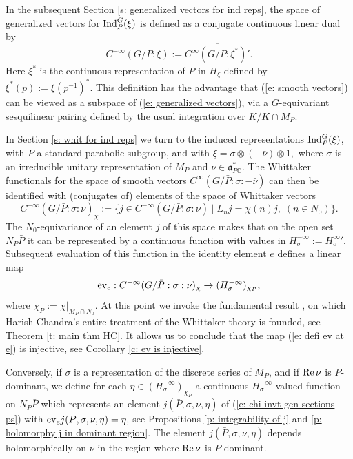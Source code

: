 \documentclass[12pt,a4paper]{article}
\def\msy#1{{\mathbb #1}}
\def\C{{\msy C}}
\def\gs{\sigma}
\def\got#1{\mathfrak #1}
\def\fa{{\got a}}
\def\to{\rightarrow}
\def\Re{{\rm Re}\,}
\def\iC{{\scriptscriptstyle \C}}
\numberwithin{Thm}{section}
\numberwithin{equation}{section}
\def\Ind{{\rm Ind}}
\def\ev{{\rm ev}}
\def\faPdc{{\fa_{P\iC}^*}}
\numberwithin{equation}{section}
\def\faPdc{\fa_{P\iC}^*}
\def\cchi{\chi}
\begin{document}
In the subsequent Section \ref{s: generalized vectors for ind reps}, the space of generalized 
vectors for $\Ind_P^G(\xi)$ is defined as a conjugate continuous linear dual by 
\begin{equation}
\label{e: generalized vectors}
C^{-\infty}(G/P:\xi) := \overline{C^\infty(G/P:\xi^*)'}.
\end{equation}
Here $\xi^*$ is the continuous representation of $P$ in $H_\xi$ defined by $\xi^*(p):= \xi(p^{-1})^*.$ 
This definition has the advantage that (\ref{e: smooth vectors}) can be viewed as a subspace of 
(\ref{e: generalized vectors}), via a $G$-equivariant sesquilinear pairing defined by the usual
integration 
over $K/K\cap M_P.$ 

In Section \ref{s: whit for ind reps} we turn to the induced representations $\Ind_{\bar P}^G(\xi)$,
with $P$ a standard parabolic subgroup, and with $\xi = \gs \otimes (-\bar \nu) \otimes 1,$
 where $\gs$ is an irreducible unitary representation
of $M_P$ and $\nu \in \faPdc.$ The Whittaker functionals for the space of smooth vectors $C^\infty(G/\bar P:\gs: -\bar \nu)$ can then be identified with (conjugates of) elements of the space
of Whittaker vectors 
\begin{equation}
\label{e: chi invt gen sections ps} 
C^{- \infty}(G/\bar P: \gs:\nu)_\cchi:= \{ j \in C^{-\infty}(G/\bar P: \gs:\nu) \mid L_n j = \cchi(n) j, \; (n \in N_0)\}.
\end{equation}
The $N_0$-equivariance of an element $j$ of this space makes that on the open set $N_P \bar P$ 
it can be represented by a continuous function with values in $ H_\gs^{- \infty }:= \overline{H_\gs^\infty}{}'.$ 
Subsequent evaluation of this function in the identity element $e$ defines a linear map
\begin{equation}
\label{e: defi ev at e} 
\ev_e: C^{- \infty}(G/\bar P: \gs:\nu)_\cchi \to (H_\gs^{- \infty })_{\cchi_P},
\end{equation}
where $\cchi_P:= \cchi|_{M_P \cap N_0}.$ At this point we invoke the fundamental result 
\cite[Thm.~1]{HCwhit}, on which Harish-Chandra's entire treatment of the Whittaker theory is founded,
see Theorem \ref{t: main thm HC}. It allows us to conclude that the map
(\ref{e: defi ev at e}) is injective, see Corollary \ref{c: ev is injective}. 
 
Conversely, if $\gs$ is a representation of the discrete series of $M_P$, and if $\Re \nu$ 
is $P$-dominant, we define for each $\eta \in (H_\gs^{-\infty})_{\cchi_P}$ 
a continuous $H_\gs^{-\infty}$-valued function on $N_P \bar P$ which represents an element 
$j(\bar P, \gs, \nu, \eta)$ 
of (\ref{e: chi invt gen sections ps}) with $\ev_e j(\bar P, \gs, \nu, \eta) = \eta,$ see
Propositions \ref{p: integrability of j} and \ref{p: holomorphy j in dominant region}.
The element $j(\bar P, \gs, \nu, \eta)$  depends holomorphically on $\nu$ 
in the region where $\Re \nu$ is $P$-dominant.
\end{document}
